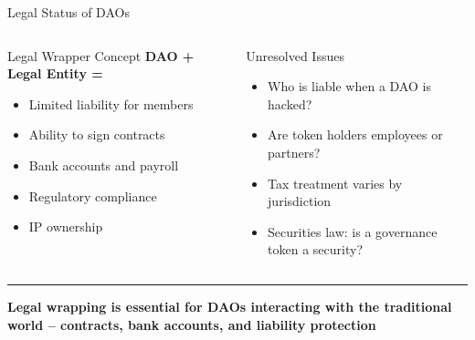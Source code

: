 \documentclass[8pt,aspectratio=169]{beamer}
\newcommand{\bottomnote}[1]{\vfill\vspace{-2mm}\textcolor{mllavender2}{\rule{\textwidth}{0.4pt}}\vspace{1mm}\footnotesize\textbf{#1}}
\begin{document}
\begin{frame}{Legal Status of DAOs}
\begin{columns}[T]
\begin{block}{Legal Wrapper Concept}
\footnotesize
\textbf{DAO + Legal Entity = }
\begin{itemize}
  \item Limited liability for members
  \item Ability to sign contracts
  \item Bank accounts and payroll
  \item Regulatory compliance
  \item IP ownership
\end{itemize}
\end{block}
\vspace{2mm}
\begin{alertblock}{Unresolved Issues}
\footnotesize
\begin{itemize}
  \item Who is liable when a DAO is hacked?
  \item Are token holders employees or partners?
  \item Tax treatment varies by jurisdiction
  \item Securities law: is a governance token a security?
\end{itemize}
\end{alertblock}
\end{columns}
\bottomnote{Legal wrapping is essential for DAOs interacting with the traditional world -- contracts, bank accounts, and liability protection}
\end{frame}
\end{document}
